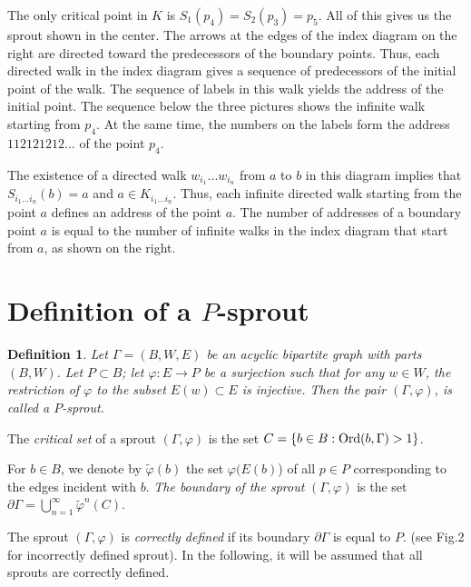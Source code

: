 \documentclass[11pt,reqno]{amsart}
\newtheorem{definition}[theorem]{Definition}
\begin{document}
The only critical point in $K$ is  $S_1(p_4)=S_2(p_3)=p_5$. 
All of this  gives us the sprout shown in the center.
The arrows at the edges of the index diagram on the right are directed toward the predecessors of the boundary points. Thus, each directed walk in the index diagram gives a sequence of predecessors of the initial point of the walk. The sequence of labels in this walk yields the address of the initial point. The sequence below the three pictures  shows the  infinite walk starting from $p_4$. At the same time, the numbers on the labels form the address 
$112121212...$ of  the point $p_4$.





The existence of a directed walk $w_{i_1}...w_{i_n}$ from $a$ to $b$ in this diagram implies that
$S_{i_1...i_n}
(b) = a$ and  $a \in K_{i_1...i_n}$. Thus, each infinite directed walk starting from the point $a$ defines an address of the point $a$. The number of addresses of a boundary point $a$ is equal to the number of infinite walks in
the index diagram that start from $a$, as shown on the right.






  
\section{Definition of a  $P$-sprout}

\begin{definition}
Let $\Gamma=(B,W,E)$ be an acyclic bipartite  graph with parts $(B,W)$.
Let $P\subset B$; let $\varphi:E\to P$ be a  surjection such that for any $w\in W$, the restriction of $\varphi$ to the subset $E(w)\subset E$ is injective. 
Then the pair $(\Gamma,\varphi)$, is called a $P$-sprout.
\end{definition}


The {\em critical set} of a sprout $(\Gamma,\varphi)$ is the set $C=\{b\in B:{\mathop{\rm Ord} \nolimits}(b,\Gamma)>1\}$. 

For  $b\in B$, we denote by ${\widetilde\varphi}(b)$ the set $\varphi(E(b)$) of all $p\in P$ corresponding to the edges incident with $b$. {\em The boundary of the sprout} $(\Gamma,\varphi)$ is the set
${\partial}\Gamma=\bigcup\limits_{n=1}^\infty \widetilde\varphi^n(C)$.



The sprout $(\Gamma,\varphi)$ is {\em correctly defined} if its boundary ${\partial}\Gamma$ is equal to $P$. (see Fig.2 for incorrectly defined sprout). In the following, it will be assumed that all sprouts are correctly defined.
\end{document}
